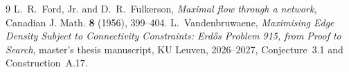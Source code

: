 \documentclass[11pt,a4paper]{amsart}
\begin{document}
\begin{thebibliography}{9}
L.~R.~Ford, Jr. and D.~R.~Fulkerson,
\emph{Maximal flow through a network},
Canadian J. Math. \textbf{8} (1956), 399--404.
L.~Vandenbruwaene,
\emph{Maximising Edge Density Subject to Connectivity Constraints:
Erd\H{o}s Problem 915, from Proof to Search},
master's thesis manuscript, KU Leuven, 2026--2027,
Conjecture~3.1 and Construction~A.17.
\end{thebibliography}
\end{document}
